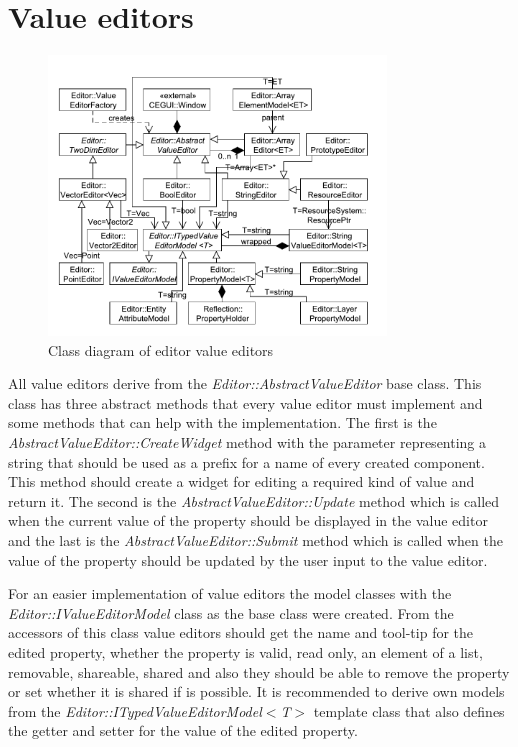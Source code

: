 \documentclass[a4paper, 12pt]{report}
\begin{document}
\section{Value editors}

\begin{figure}[htbp]
	\centering
		\includegraphics[width=0.8\textwidth]{EditorValueEditorsClassDiagram.pdf}
	\caption{Class diagram of editor value editors}
	\label{fig:editor-value-editors-diagram}
\end{figure}

All value editors derive from the \emph{Editor::AbstractValueEditor} base class. This class has three abstract methods that every value editor must implement and some methods that can help with the implementation. The first is the \emph{AbstractValueEditor::CreateWidget} method with the parameter representing a string that should be used as a prefix for a name of every created component. This method should create a widget for editing a required kind of value and return it. The second is the \emph{AbstractValueEditor::Update} method which is called when the current value of the property should be displayed in the value editor and the last is the \emph{AbstractValueEditor::Submit} method which is called when the value of the property should be updated by the user input to the value editor.

For an easier implementation of value editors the model classes with the \emph{Editor::IValueEditorModel} class as the base class were created. From the accessors of this class value editors should get the name and tool-tip for the edited property, whether the property is valid, read only, an element of a list, removable, shareable, shared and also they should be able to remove the property or set whether it is shared if is possible. It is recommended to derive own models from the \emph{Editor::ITypedValueEditor\-Model$<$T$>$} template class that also defines the getter and setter for the value of the edited property.
\end{document}
